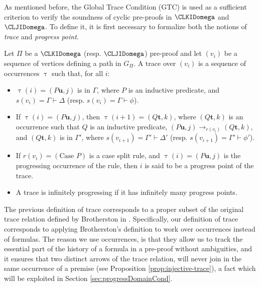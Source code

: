 As mentioned before, the Global Trace Condition (GTC) is used as a sufficient criterion to verify the soundness of cyclic pre-proofs in $\CLKIDomega$ and $\CLJIDomega$. To define it, it is first necessary to formalize both the notions of \emph{trace} and \emph{progress point}. 

\begin{definition}
    \label{def:traceCyclic}
    Let $\Pi$ be a $\CLKIDomega$ (resp. $\CLJIDomega$) pre-proof and let $(v_i)$ be a sequence of vertices defining a path in $G_{\Pi}$. A trace over $(v_i)$ is a sequence of occurrences $\uptau$ such that, for all $i$:

    \begin{itemize}
          \item $\uptau(i) = (P\mathbf{u},j)$ is in $\Gamma$, where $P$ is an inductive predicate, and $s(v_i) = \Gamma \vdash \Delta$ (resp. $s(v_i) = \Gamma \vdash \phi$).

          \item If $\uptau(i) = (P\mathbf{u},j)$, then $\uptau(i+1) = (Q\mathbf{t},k)$, where $(Q\mathbf{t},k)$ is an occurrence such that $Q$ is an inductive predicate, $(P\mathbf{u},j) \rightarrow_{r(v_i)} (Q\mathbf{t},k)$, and $(Q\mathbf{t},k)$ is in $\Gamma'$, where $s(v_{i+1}) = \Gamma' \vdash \Delta'$ (resp. $s(v_{i+1}) = \Gamma' \vdash \phi'$).

          \item If $r(v_i) = (\text{Case } P)$ is a case split rule, and $\uptau(i) = (P\mathbf{u},j)$ is the progressing occurrence of the rule, then $i$ is said to be a progress point of the trace.
          \item A trace is infinitely progressing if it has infinitely many progress points.
    \end{itemize}  

\end{definition}

\begin{remark}
    \label{rem:traceDef}
    The previous definition of trace corresponds to a proper subset of the original trace relation defined by Brotherston in \cite[Definition 4.2.3]{Brotherston1}. Specifically, our definition of trace corresponds to applying Brotherston's definition to work over occurrences instead of formulas. The reason we use occurrences, is that they allow us to track the essential part of the history of a formula in a pre-proof without ambiguities, and it ensures that two distinct arrows of the trace relation, will never join in the same occurrence of a premise (see Proposition \ref{prop:injective-trace}), a fact which will be exploited in Section \ref{sec:progressDomainCond}.
\end{remark}  

